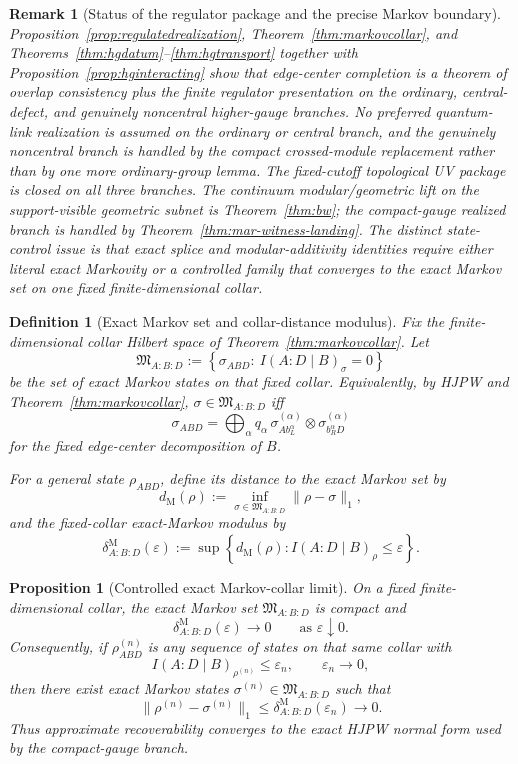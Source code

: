 \documentclass[11pt]{article}
\newtheorem{proposition}[theorem]{Proposition}
\newtheorem{definition}[theorem]{Definition}
\newtheorem{remark}[theorem]{Remark}
\begin{document}
\begin{remark}[Status of the regulator package and the precise Markov boundary]
Proposition~\ref{prop:regulatedrealization}, Theorem~\ref{thm:markovcollar}, and Theorems~\ref{thm:hgdatum}--\ref{thm:hgtransport} together with Proposition~\ref{prop:hginteracting} show that edge-center completion is a theorem of overlap consistency plus the finite regulator presentation on the ordinary, central-defect, and genuinely noncentral higher-gauge branches. No preferred quantum-link realization is assumed on the ordinary or central branch, and the genuinely noncentral branch is handled by the compact crossed-module replacement rather than by one more ordinary-group lemma. The fixed-cutoff topological UV package is closed on all three branches. The continuum modular/geometric lift on the support-visible geometric subnet is Theorem~\ref{thm:bw}; the compact-gauge realized branch is handled by Theorem~\ref{thm:mar-witness-landing}. The distinct state-control issue is that exact splice and modular-additivity identities require either literal exact Markovity or a controlled family that converges to the exact Markov set on one fixed finite-dimensional collar.
\end{remark}

\begin{definition}[Exact Markov set and collar-distance modulus]\label{def:markovmodulus}
Fix the finite-dimensional collar Hilbert space of Theorem~\ref{thm:markovcollar}. Let
\[
\mathfrak M_{A:B:D}
:=
\left\{
\sigma_{ABD}:\ I(A:D\mid B)_\sigma=0
\right\}
\]
be the set of exact Markov states on that fixed collar. Equivalently, by HJPW and Theorem~\ref{thm:markovcollar}, \(\sigma\in\mathfrak M_{A:B:D}\) iff
\[
\sigma_{ABD}
=
\bigoplus_\alpha q_\alpha\,
\sigma^{(\alpha)}_{A b_L^\alpha}\otimes \sigma^{(\alpha)}_{b_R^\alpha D}
\]
for the fixed edge-center decomposition of \(B\).

For a general state \(\rho_{ABD}\), define its distance to the exact Markov set by
\[
d_{\mathrm M}(\rho):=\inf_{\sigma\in\mathfrak M_{A:B:D}}\|\rho-\sigma\|_1,
\]
and the fixed-collar exact-Markov modulus by
\[
\delta^{\mathrm M}_{A:B:D}(\varepsilon)
:=
\sup\left\{
d_{\mathrm M}(\rho):
I(A:D\mid B)_\rho\le \varepsilon
\right\}.
\]
\end{definition}

\begin{proposition}[Controlled exact Markov-collar limit]\label{prop:controlledmarkov}
On a fixed finite-dimensional collar, the exact Markov set \(\mathfrak M_{A:B:D}\) is compact and
\[
\delta^{\mathrm M}_{A:B:D}(\varepsilon)\longrightarrow 0
\qquad
\text{as }\varepsilon\downarrow 0.
\]
Consequently, if \(\rho^{(n)}_{ABD}\) is any sequence of states on that same collar with
\[
I(A:D\mid B)_{\rho^{(n)}}\le \varepsilon_n,
\qquad
\varepsilon_n\to0,
\]
then there exist exact Markov states \(\sigma^{(n)}\in\mathfrak M_{A:B:D}\) such that
\[
\|\rho^{(n)}-\sigma^{(n)}\|_1
\le
\delta^{\mathrm M}_{A:B:D}(\varepsilon_n)
\longrightarrow 0.
\]
Thus approximate recoverability converges to the exact HJPW normal form used by the compact-gauge branch.
\end{proposition}
\end{document}

